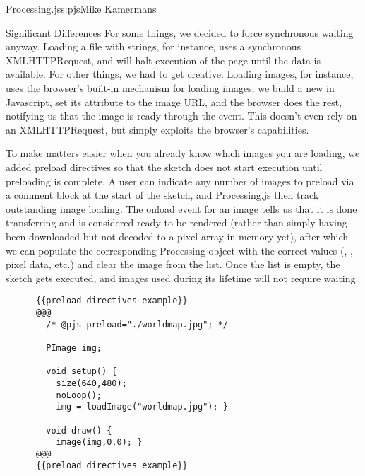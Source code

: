 \begin{aosachapter}{Processing.js}{s:pjs}{Mike Kamermans}
\begin{aosasect1}{Significant Differences}
For some things, we decided to force synchronous waiting
anyway. Loading a file with strings, for instance, uses a synchronous
XMLHTTPRequest, and will halt execution of the page until the data is
available. For other things, we had to get creative. Loading images,
for instance, uses the browser's built-in mechanism for loading
images; we build a new  in Javascript, set its 
attribute to the image URL, and the browser does the rest, notifying
us that the image is ready through the  event. This
doesn't even rely on an XMLHTTPRequest, but simply exploits the
browser's capabilities.

To make matters easier when you already know which images you are
loading, we added preload directives so that the sketch does not start
execution until preloading is complete. A user can indicate any number
of images to preload via a comment block at the start of the sketch,
and Processing.js then track outstanding image loading. The onload
event for an image tells us that it is done transferring and is
considered ready to be rendered (rather than simply having been
downloaded but not decoded to a pixel array in memory yet), after
which we can populate the corresponding Processing 
object with the correct values (, , pixel
data, etc.) and clear the image from the list. Once the list is empty,
the sketch gets executed, and images used during its lifetime will not
require waiting.

\begin{verbatim}
      {{preload directives example}}
      @@@
        /* @pjs preload="./worldmap.jpg"; */

        PImage img;

        void setup() {
          size(640,480);
          noLoop();
          img = loadImage("worldmap.jpg"); }

        void draw() {
          image(img,0,0); }
      @@@
      {{preload directives example}}
\end{verbatim}


\end{aosasect1}
\end{aosachapter}
